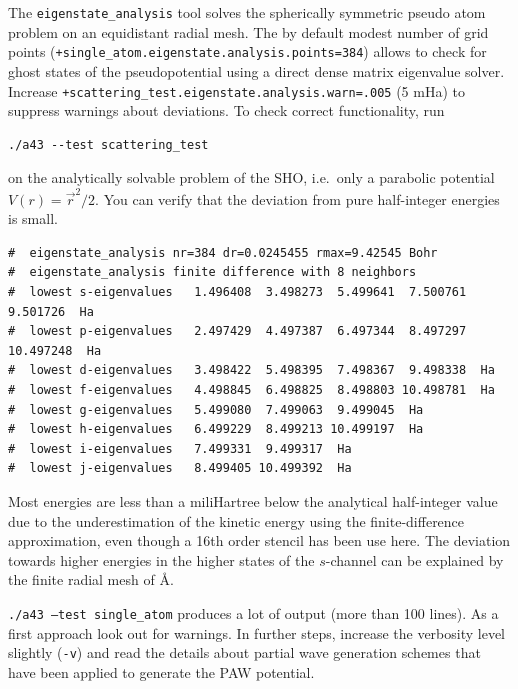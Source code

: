 \documentclass[oribibl]{llncs}
\newcommand{\ttt}[1]{\texttt{#1}}
\begin{document}
\noindent
The \ttt{eigenstate\_analysis} tool solves the spherically symmetric pseudo atom
problem on an equidistant radial mesh. The by default modest number of grid points (\ttt{+single\_atom.eigenstate.analysis.points=384}) allows to check for ghost states of the pseudopotential using a direct dense matrix eigenvalue solver.
Increase \ttt{+scattering\_test.eigenstate.analysis.warn=.005} (5 mHa) to suppress warnings about deviations.
To check correct functionality, run
\begin{verbatim}
./a43 --test scattering_test
\end{verbatim}
on the analytically solvable problem of the \ac{SHO}, i.e.~only a parabolic potential $V(r) = {\vec r}^2/2$.
You can verify that the deviation from pure half-integer energies is small.
\small
\begin{verbatim}
#  eigenstate_analysis nr=384 dr=0.0245455 rmax=9.42545 Bohr
#  eigenstate_analysis finite difference with 8 neighbors
#  lowest s-eigenvalues   1.496408  3.498273  5.499641  7.500761  9.501726  Ha
#  lowest p-eigenvalues   2.497429  4.497387  6.497344  8.497297 10.497248  Ha
#  lowest d-eigenvalues   3.498422  5.498395  7.498367  9.498338  Ha
#  lowest f-eigenvalues   4.498845  6.498825  8.498803 10.498781  Ha
#  lowest g-eigenvalues   5.499080  7.499063  9.499045  Ha
#  lowest h-eigenvalues   6.499229  8.499213 10.499197  Ha
#  lowest i-eigenvalues   7.499331  9.499317  Ha
#  lowest j-eigenvalues   8.499405 10.499392  Ha
\end{verbatim}
\normalsize
Most energies are less than a miliHartree below the analytical half-integer value due to the underestimation of the kinetic energy using the finite-difference approximation, even though a 16th order stencil has been use here.
The deviation towards higher energies in the higher states of the $s$-channel can be explained by the finite radial mesh of \unit[5]{\AA}.

\noindent
\ttt{./a43 --test single\_atom} produces a lot of output (more than 100 lines).
As a first approach look out for warnings.
In further steps, increase the verbosity level slightly (\ttt{-v}) and read the details about partial wave generation schemes that have been applied to generate the \ac{PAW} potential.
\end{document}
